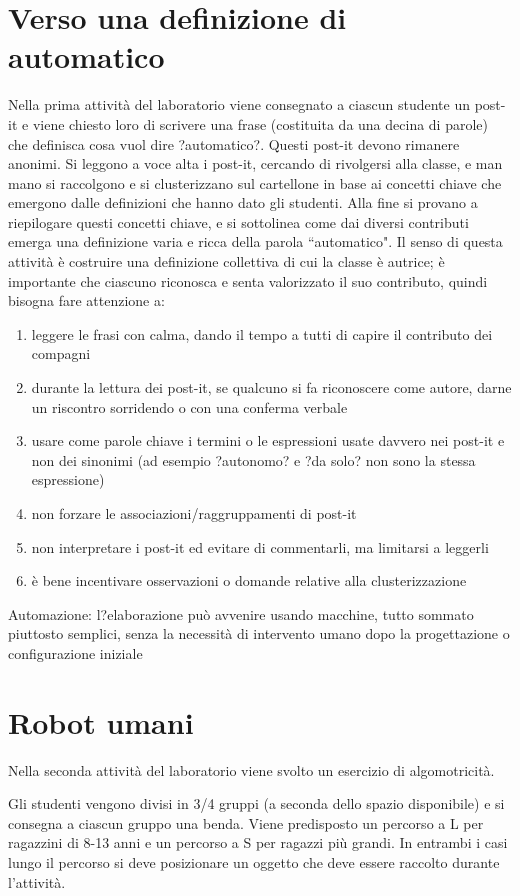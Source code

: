 \documentclass[12pt]{article}
\begin{document}
\section{Verso una definizione di automatico}
Nella prima attività del laboratorio viene consegnato a ciascun studente un post-it e viene chiesto loro di scrivere una frase (costituita da una decina di parole) che definisca cosa vuol dire ?automatico?. Questi post-it devono rimanere anonimi.
Si leggono a voce alta i post-it, cercando di rivolgersi alla classe, e man mano si raccolgono e si clusterizzano sul cartellone in base ai concetti chiave che emergono dalle definizioni che hanno dato gli studenti.
Alla fine si provano a riepilogare questi concetti chiave, e si sottolinea come dai diversi contributi emerga una definizione varia e ricca della parola ``automatico".
Il senso di questa attività è costruire una definizione collettiva di cui la classe è autrice; è importante che ciascuno riconosca e senta valorizzato il suo contributo, quindi bisogna fare attenzione a:
\begin{enumerate}
\item leggere le frasi con calma, dando il tempo a tutti di capire il contributo dei compagni
\item durante la lettura dei post-it, se qualcuno si fa riconoscere come autore, darne un riscontro sorridendo o con una conferma verbale
\item usare come parole chiave i termini o le espressioni usate davvero nei post-it e non dei sinonimi (ad esempio ?autonomo? e ?da solo? non sono la stessa espressione)
\item non forzare le associazioni/raggruppamenti di post-it
\item non interpretare i post-it ed evitare di commentarli, ma limitarsi a leggerli
\item è bene incentivare osservazioni o domande relative alla clusterizzazione
\end{enumerate}

Automazione: l?elaborazione può avvenire usando macchine, tutto sommato piuttosto semplici, senza la necessità di intervento umano dopo la progettazione o configurazione iniziale
\section{Robot umani}
Nella seconda attività del laboratorio viene svolto un esercizio di algomotricità.

Gli studenti vengono divisi in 3/4 gruppi (a seconda dello spazio disponibile) e si consegna a ciascun gruppo una benda. Viene predisposto un percorso a L per ragazzini di 8-13 anni e un percorso a S per ragazzi più grandi. In entrambi i casi lungo il percorso si deve posizionare un oggetto che deve essere raccolto durante l'attività.
\end{document}
